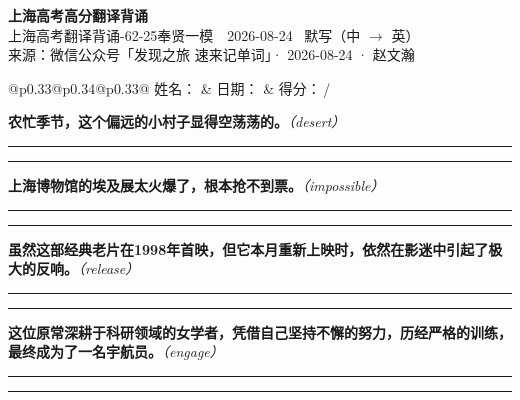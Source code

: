 \documentclass[11pt,a4paper]{article}
\newcommand{\num}[1]{\makebox[1.9em][r]{#1.}\hspace{0.3em}}
\newcommand{\wline}{\noindent\rule{\linewidth}{0.4pt}}
\newcommand{\prompt}[1]{\emph{\textcolor{tipblue}{\small（#1）}}}
\begin{document}
\pagestyle{plain}
\begin{center}
{\LARGE\bfseries 上海高考高分翻译背诵 }\\[0.25em]
{\large 上海高考翻译背诵-62-25奉贤一模　2026-08-24 \quad\ 默写（中 $\to$ 英）}\\[0.35em]
{\footnotesize 来源：微信公众号「发现之旅 速来记单词」· 2026-08-24 · 赵文瀚}
\end{center}

\vspace{0.4em}
\noindent\begin{tabular}{@{}p{0.33\textwidth}@{}p{0.34\textwidth}@{}p{0.33\textwidth}@{}}
姓名：\underline{\hspace{2.0cm}} & 日期：\underline{\hspace{2.0cm}} & 得分：\underline{\hspace{1.4cm}}\,/ \\
\end{tabular}

\vspace{0.5em}

\vspace{0.8em}
\num{1}\textbf{农忙季节，这个偏远的小村子显得空荡荡的。}\prompt{desert}

\vspace{0.3em}

\wline\vspace{0.3em}
\wline

\num{2}\textbf{上海博物馆的埃及展太火爆了，根本抢不到票。}\prompt{impossible}

\vspace{0.3em}

\wline\vspace{0.3em}
\wline

\num{3}\textbf{虽然这部经典老片在1998年首映，但它本月重新上映时，依然在影迷中引起了极大的反响。}\prompt{release}

\vspace{0.3em}

\wline\vspace{0.3em}
\wline

\num{4}\textbf{这位原常深耕于科研领域的女学者，凭借自己坚持不懈的努力，历经严格的训练，最终成为了一名宇航员。}\prompt{engage}

\vspace{0.3em}

\wline\vspace{0.3em}
\wline
\end{document}

